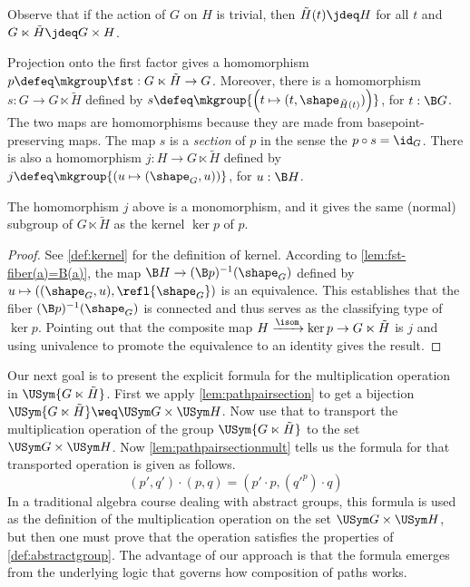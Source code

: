 Observe that if the action of $G$ on $H$ is trivial, then $\tilde H(t) \jdeq H$ for all $t$ and $G \ltimes \tilde H \jdeq G \times H$.

Projection onto the first factor gives a homomorphism $p \defeq \mkgroup \fst : G \ltimes \tilde H \to G$.
Moreover, there is a homomorphism $s : G \to G \ltimes \tilde H$ defined by
$ s \defeq \mkgroup {\left( t \mapsto (t,\shape_{\tilde H(t)}) \right) }$, for $t : \B G$.
The two maps are homomorphisms because they are made from basepoint-preserving maps.
The map $s$ is a \emph{section} of $p$ in the sense the $p \circ s = \id_G$.
There is also a homomorphism $j : H \to G \ltimes \tilde H$ defined by $j \defeq \mkgroup { \left( u \mapsto (\shape_G,u) \right) }$, for $u : \B H$.

\begin{lemma}
  The homomorphism $j$ above is a monomorphism, and it gives the same (normal) subgroup of $G \ltimes \tilde H$ as the kernel $\ker p$ of $p$.
\end{lemma}

\begin{proof}
  See \ref{def:kernel} for the definition of kernel.  According to \cref{lem:fst-fiber(a)=B(a)}, the map $\B H \to (\B p)^{-1}(\shape_G)$ defined by
  $ u \mapsto ((\shape_G,u), \refl{\shape_G}) $ is an equivalence.  This establishes that the fiber $(\B p)^{-1}(\shape_G)$ is connected and thus serves as
  the classifying type of $\ker p$.  Pointing out that the composite map $H \xrightarrow{\isom} \ker p \to G \ltimes \tilde H$ is $j$ and using
  univalence to promote the equivalence to an identity gives the result.
\end{proof}

Our next goal is to present the explicit formula for the multiplication operation in $\USym { G \ltimes \tilde H }$.
First we apply \cref{lem:pathpairsection} to get a bijection $\USym { G \ltimes \tilde H } \weq \USym G \times \USym H$.
Now use that to transport the multiplication operation of the group $\USym { G \ltimes \tilde H }$ to the set $\USym G \times \USym H$.
Now \cref{lem:pathpairsectionmult} tells us the formula for that transported operation is given as follows.
$$ (p',q') \cdot (p,q) = (p' \cdot p , ({q'} ^ p) \cdot q) $$
In a traditional algebra course dealing with abstract groups, this formula is used as the definition of the multiplication operation
on the set $\USym G \times \USym H$, but then one must prove that the operation satisfies the properties of \cref{def:abstractgroup}.
The advantage of our approach is that the formula emerges from the underlying logic that governs how composition of paths works.

